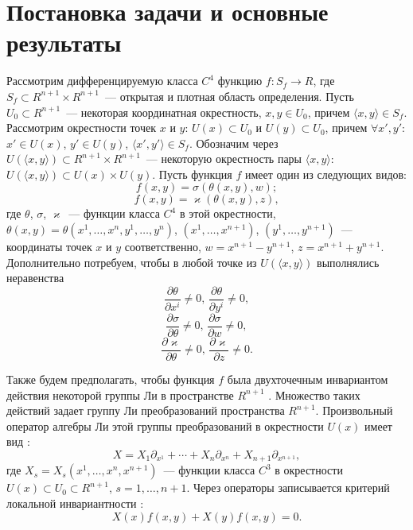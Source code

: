\section{Постановка задачи и основные результаты}
Рассмотрим дифференцируемую класса $C^4$ функцию $f:S_f\to R$, где $S_f\subset R^{n+1}\times
R^{n+1}$~--- открытая  и плотная  область определения. Пусть $U_0\subset R^{n+1}$~--- некоторая  координатная  окрестность, $x,y\in U_0$, причем $\langle x,y\rangle\in S_f$. Рассмотрим окрестности точек $x$ и $y$: $U(x)\subset U_0$ и $U(y)\subset U_0$, причем $\forall x',y'$: $x'\in U(x)$, $y'\in U(y)$, $\langle x',y'\rangle\in S_f$. Обозначим через $U(\langle x,y\rangle)\subset R^{n+1}\times R^{n+1}$~--- некоторую окрестность пары $\langle x,y\rangle$: $U(\langle x,y\rangle)\subset U(x)\times U(y)$. Пусть функция  $f$ имеет один из следующих видов:
\begin{equation}\label{1.1}
f(x,y) = \sigma\left(\theta(x,y),w\right);\end{equation}
\begin{equation}\label{1.2} f(x,y) = \varkappa\left(\theta(x,y),z\right),\end{equation}
где $\theta$, $\sigma$, $\varkappa$~--- функции класса $C^4$ в этой окрестности, $\theta(x,y)=\theta(x^1,\ldots,x^n,y^1,\ldots,y^n)$, $(x^1,\ldots,x^{n+1})$, $(y^1,\ldots,y^{n+1})$~--- координаты точек $x$ и $y$ соответственно, $w = x^{n+1}-y^{n+1}$, $z = x^{n+1}+y^{n+1}$. Дополнительно потребуем, чтобы в любой точке из $U(\langle x,y\rangle)$ выполнялись неравенства \cite{mikh}
\begin{equation}\label{1.3} \dfrac{\partial\theta}{\partial x^{i}}\ne0,\,\dfrac{\partial\theta}{\partial y^{i}}\ne0, \end{equation}
\begin{equation}\label{1.4} \dfrac{\partial \sigma}{\partial\theta}\ne0,\,\dfrac{\partial \sigma}{\partial w}\ne0, \end{equation}
\begin{equation}\label{1.5} \dfrac{\partial \varkappa}{\partial\theta}\ne0,\,\dfrac{\partial \varkappa}{\partial z}\ne0. \end{equation}

Также будем предполагать, чтобы функция  $f$ была двухточечным инвариантом действия  некоторой группы Ли в пространстве $R^{n+1}$ \cite{ovs}. Множество таких действий задает группу Ли преобразований пространства $R^{n+1}$. Произвольный оператор алгебры Ли этой группы преобразований в окрестности $U(x)$ имеет вид \cite{mikh}:
\begin{equation}\label{1.6} X = X_1\partial_{x^1}+ \cdots+ X_{n}\partial_{x^{n}} + X_{n+1}\partial_{x^{n+1}}, \end{equation}
где $X_s = X_s(x^1,\ldots,x^n,x^{n+1})$~--- функции класса $C^3$ в окрестности $U(x)\subset U_0\subset R^{n+1}$, $s
= 1,\ldots,n+1$. Через операторы записывается  критерий локальной
инвариантности \cite{ovs}: \begin{equation}\label{1.7} X(x)f(x,y) +
X(y)f(x,y) = 0. \end{equation}

